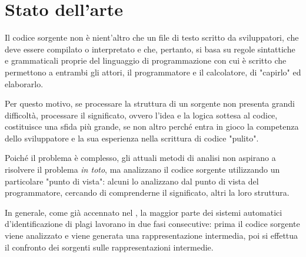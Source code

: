 
\section{Stato dell'arte}

Il codice sorgente non è nient'altro che un file di testo scritto da sviluppatori, che deve essere compilato o interpretato e che, pertanto, si basa su regole sintattiche e grammaticali proprie del linguaggio di programmazione con cui è scritto che permettono a entrambi gli attori, il programmatore e il calcolatore, di "capirlo" ed elaborarlo.

Per questo motivo, se processare la struttura di un sorgente non presenta grandi difficoltà, processare il significato, ovvero l'idea e la logica sottesa al codice, costituisce una sfida più grande, se non altro perché entra in gioco la competenza dello sviluppatore e la sua esperienza nella scrittura di codice "pulito".

Poiché il problema è complesso, gli attuali metodi di analisi non aspirano a risolvere il problema \textit{in toto}, ma analizzano il codice sorgente utilizzando un particolare "punto di vista": alcuni lo analizzano dal punto di vista del programmatore, cercando di comprenderne il significato, altri la loro struttura.





In generale, come già accennato nel , la maggior parte dei sistemi automatici d'identificazione di plagi lavorano in due fasi consecutive: prima il codice sorgente viene analizzato e viene generata una rappresentazione intermedia, poi si effettua il confronto dei sorgenti sulle rappresentazioni intermedie.

